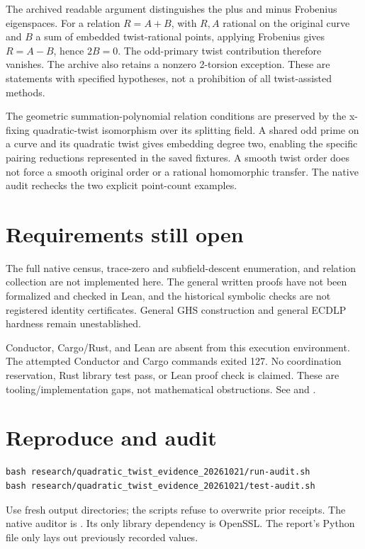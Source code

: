 \documentclass[10pt]{article}
\begin{document}
The archived readable argument distinguishes the plus and minus Frobenius
eigenspaces. For a relation $R=A+B$, with $R,A$ rational on the original curve
and $B$ a sum of embedded twist-rational points, applying Frobenius gives
$R=A-B$, hence $2B=0$. The odd-primary twist contribution therefore vanishes.
The archive also retains a nonzero 2-torsion exception. These are statements
with specified hypotheses, not a prohibition of all twist-assisted methods.

The geometric summation-polynomial relation conditions are preserved by the
x-fixing quadratic-twist isomorphism over its splitting field. A shared odd
prime on a curve and its quadratic twist gives embedding degree two, enabling
the specific pairing reductions represented in the saved fixtures. A smooth
twist order does not force a smooth original order or a rational homomorphic
transfer. The native audit rechecks the two explicit point-count examples.

\section*{Requirements still open}
The full native census, trace-zero and subfield-descent enumeration, and relation
collection are not implemented here. The general written proofs have not been
formalized and checked in Lean, and the historical symbolic checks are not
registered identity certificates. General GHS construction and general ECDLP
hardness remain unestablished.

Conductor, Cargo/Rust, and Lean are absent from this execution environment.
The attempted Conductor and Cargo commands exited 127. No coordination
reservation, Rust library test pass, or Lean proof check is claimed. These are
tooling/implementation gaps, not mathematical obstructions. See
 and .

\section*{Reproduce and audit}
\begin{verbatim}
bash research/quadratic_twist_evidence_20261021/run-audit.sh
bash research/quadratic_twist_evidence_20261021/test-audit.sh
\end{verbatim}
Use fresh output directories; the scripts refuse to overwrite prior receipts.
The native auditor is . Its only library dependency is OpenSSL.
The report's Python file only lays out previously recorded values.
\end{document}
